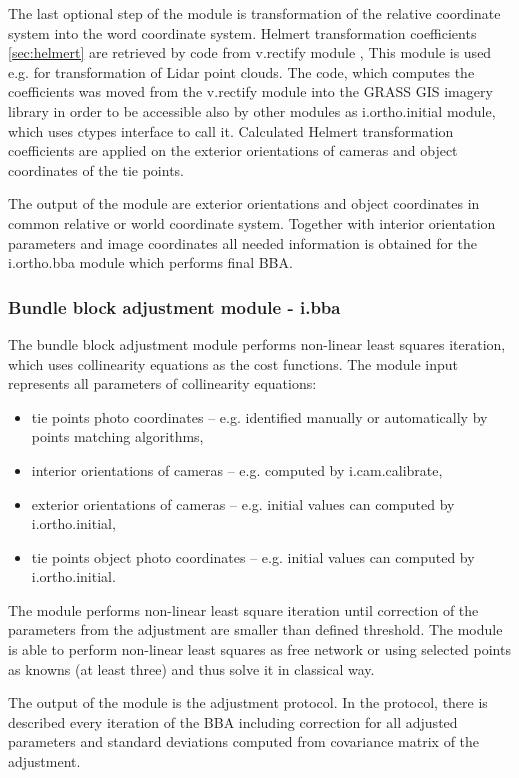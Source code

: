 \documentclass[a4paper,12pt]{article}
\begin{document}
The last optional step of the module is transformation of the relative coordinate system into the word coordinate system. Helmert 
transformation coefficients \ref{sec:helmert} are retrieved by code from v.rectify module \cite{v.rectify}, 
This module is used e.g. for transformation of Lidar point clouds.
The code, which computes the coefficients
was moved from the v.rectify module into the GRASS GIS imagery library in order to be accessible also by other modules as i.ortho.initial
module, which uses ctypes interface to call it.
Calculated Helmert transformation coefficients are applied on the exterior orientations of cameras and object coordinates of the tie points.

The output of the module are exterior orientations and object coordinates in common relative or world coordinate system. Together with interior
orientation parameters and image coordinates all needed information is obtained for the i.ortho.bba module which performs final BBA.  

\subsubsection{Bundle block adjustment module - i.bba}

The bundle block adjustment module performs non-linear least squares iteration, which 
uses collinearity equations as the cost functions. 
The module input represents all parameters of collinearity equations:
\begin{itemize}
\item tie points photo coordinates -- e.g. identified manually or automatically by points matching algorithms,
\item interior orientations of cameras -- e.g. computed by i.cam.calibrate,
\item exterior orientations of cameras -- e.g. initial values can computed by i.ortho.initial,
\item tie points object photo coordinates -- e.g. initial values can computed by i.ortho.initial.
\end{itemize}

The module performs non-linear least square iteration until correction of the parameters from the adjustment are smaller than
defined threshold. The module is able to perform non-linear least squares as free network or using selected points 
as knowns (at least three) and thus solve it in classical way. 

The output of the module is the adjustment protocol. In the protocol, there
is described every iteration of the BBA including correction for all adjusted parameters and standard deviations computed from 
covariance matrix of the adjustment. 
\end{document}
